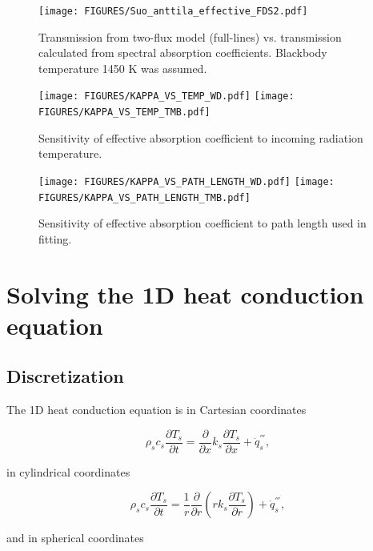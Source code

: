 \begin{figure}[ht]
    \centering
    \texttt{[image: FIGURES/Suo\_anttila\_effective\_FDS2.pdf]}
    \caption{Transmission from two-flux model (full-lines) vs. transmission calculated from spectral absorption coefficients. Blackbody temperature 1450 K was assumed.}
    \label{fig_trans3}
\end{figure}

\begin{figure}[ht]
    \centering
    \texttt{[image: FIGURES/KAPPA\_VS\_TEMP\_WD.pdf]}
    \texttt{[image: FIGURES/KAPPA\_VS\_TEMP\_TMB.pdf]}

    \caption{Sensitivity of effective absorption coefficient to incoming radiation temperature.}
    \label{fig_kapvtemp}
\end{figure}

\begin{figure}[ht]
    \centering
    \texttt{[image: FIGURES/KAPPA\_VS\_PATH\_LENGTH\_WD.pdf]}
    \texttt{[image: FIGURES/KAPPA\_VS\_PATH\_LENGTH\_TMB.pdf]}

    \caption{Sensitivity of effective absorption coefficient to path length used in fitting.}
    \label{fig_kapvPlength}
\end{figure}

\chapter{Solving the 1D heat conduction equation}\label{discretization}

\section{Discretization}
The 1D heat conduction equation is in Cartesian coordinates

\begin{equation}
\label{heat_cond_cart}
     \rho_s c_s \frac{\partial T_s}{\partial t} = \frac{\partial}{\partial x} k_s \frac{\partial T_s}{\partial x} + \dot{q}^{'''}_s, 
\end{equation}

in cylindrical coordinates

\begin{equation}
\label{heat_cond_cyl}
     \rho_s c_s \frac{\partial T_s}{\partial t} = \frac{1}{r}\frac{\partial}{\partial r} (r k_s \frac{\partial T_s}{\partial r}) + \dot{q}^{'''}_s, 
\end{equation}

and in spherical coordinates


